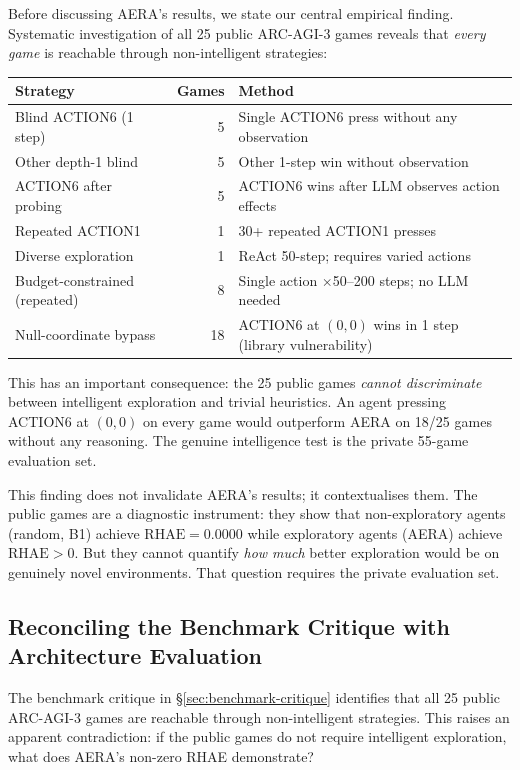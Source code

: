 \documentclass[11pt]{article}
\begin{document}
Before discussing AERA's results, we state our central empirical finding. Systematic investigation of all 25 public ARC-AGI-3 games reveals that \emph{every game} is reachable through non-intelligent strategies:

\begin{center}
\begin{tabular}{lrl}
\toprule
Strategy & Games & Method \\
\midrule
Blind ACTION6 (1 step) & 5 & Single ACTION6 press without any observation \\
Other depth-1 blind & 5 & Other 1-step win without observation \\
ACTION6 after probing & 5 & ACTION6 wins after LLM observes action effects \\
Repeated ACTION1 & 1 & 30+ repeated ACTION1 presses \\
Diverse exploration & 1 & ReAct 50-step; requires varied actions \\
Budget-constrained (repeated) & 8 & Single action $\times$50--200 steps; no LLM needed \\
\midrule
Null-coordinate bypass & 18 & ACTION6 at $(0,0)$ wins in 1 step (library vulnerability) \\
\bottomrule
\end{tabular}
\end{center}

This has an important consequence: the 25 public games \emph{cannot discriminate} between intelligent exploration and trivial heuristics. An agent pressing ACTION6 at $(0,0)$ on every game would outperform AERA on 18/25 games without any reasoning. The genuine intelligence test is the private 55-game evaluation set.

This finding does not invalidate AERA's results; it contextualises them. The public games are a diagnostic instrument: they show that non-exploratory agents (random, B1) achieve $\text{RHAE}{=}0.0000$ while exploratory agents (AERA) achieve $\text{RHAE}{>}0$. But they cannot quantify \emph{how much} better exploration would be on genuinely novel environments. That question requires the private evaluation set.

\subsection{Reconciling the Benchmark Critique with Architecture Evaluation}
\label{sec:reconcile}

The benchmark critique in \S\ref{sec:benchmark-critique} identifies that all 25 public ARC-AGI-3 games are reachable through non-intelligent strategies. This raises an apparent contradiction: if the public games do not require intelligent exploration, what does AERA's non-zero RHAE demonstrate?
\end{document}
